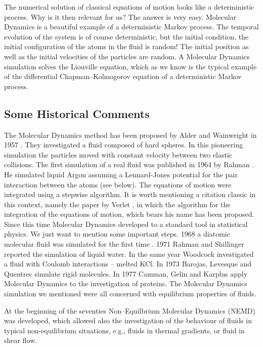 The numerical solution of classical equations of motion looks like a
deterministic process. Why is it then relevant for us? 
The answer is very easy. Molecular Dynamics is a beautiful
example of a deterministic Markov process. The temporal evolution of the system
is of course deterministic, but the initial condition, the initial
configuration of the atoms in the fluid is random! 
The initial position as well as the initial velocities of the particles are
random. A Molecular Dynamics
simulation solves the Liouville equation, which as we know 
is the typical example of the differential Chapman--Kolmogorov equation 
of a deterministic Markov process.

\subsection{Some Historical Comments}
The Molecular Dynamics method has been proposed by Alder and Wainwright
in 1957 \cite{AlderWainwright57,AlderWainwright59}. They investigated a fluid
composed of hard spheres. In this pioneering simulation the particles moved
with constant velocity between two elastic collisions. The first simulation of
a real fluid was published in 1964 by Rahman \cite{Rahman}. He simulated
liquid Argon assuming a Lennard-Jones potential for the pair interaction
between the atoms (see below). The equations of motion were integrated using a
stepwise algorithm. It is worth mentioning a citation classic in this context,
namely the paper by Verlet \cite{Verlet67,Verlet68}, in which the 
algorithm for the  integration of the equations of motion, 
which bears his name has been proposed. Since this time Molecular Dynamics
developed to a standard tool in statistical physics. We just want to mention
some important steps. 1968 a diatomic molecular
fluid was simulated for the first time \cite{HarpBerne}. 1971 Rahman and
Shillinger reported the simulation of liquid water. In the same year Woodcock
investigated a fluid with Coulomb interactions -- melted KCl. In 1973 
Barojas, Levesque and Quentrec simulate rigid molecules. In 1977 Camman, Gelin
and Karplus apply Molecular Dynamics to the investigation of proteins. 
The Molecular Dynamics simulation we mentioned were all concerned with
equilibrium properties of fluids. 

At the beginning of the seventies
Non--Equilbrium Molecular Dynamics (NEMD) was developed, which allowed also the
investigation of the behaviour of fluids in typical non-equilibrium situations,
e.g., fluids in thermal gradients, or fluid in shear flow.

